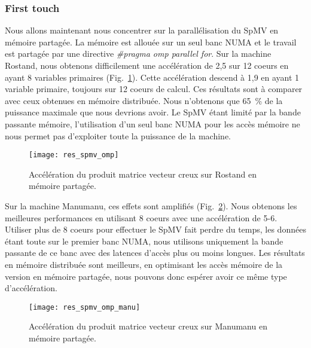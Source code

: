 \subsubsection{First touch}
Nous allons maintenant nous concentrer sur la parallélisation du SpMV en mémoire partagée.
%
La mémoire est allouée sur un seul banc NUMA et le travail est partagée par une directive {\em \#pragma omp parallel for}.
%
Sur la machine Rostand, nous obtenons difficilement une accélération de 2,5 sur 12 coeurs en ayant 8 variables primaires (Fig.~\ref{fig:res_spmv_omp_rostand}).
%
Cette accélération descend à 1,9 en ayant 1 variable primaire, toujours sur 12 coeurs de calcul.
%
Ces résultats sont à comparer avec ceux obtenues en mémoire distribuée.
%
Nous n'obtenons que 65~\% de la puissance maximale que nous devrions avoir.
%
Le SpMV étant limité par la bande passante mémoire, l'utilisation d'un seul banc NUMA pour les accès mémoire ne nous permet pas d'exploiter toute la puissance de la machine.


\begin{figure}
  \centering
  \texttt{[image: res\_spmv\_omp]}
  \caption{Accélération du produit matrice vecteur creux sur Rostand en mémoire partagée.}
  \label{fig:res_spmv_omp_rostand}
\end{figure}



Sur la machine Manumanu, ces effets sont amplifiés (Fig.~\ref{fig:res_spmv_omp_manumanu}).
%
Nous obtenons les meilleures performances en utilisant 8 coeurs avec une accélération de 5-6.
%
Utiliser plus de 8 coeurs pour effectuer le SpMV fait perdre du temps, les données étant toute sur le premier banc NUMA, nous utilisons uniquement la bande passante de ce banc avec des latences d'accès plus ou moins longues.
%
Les résultats en mémoire distribuée sont meilleurs, en optimisant les accès mémoire de la version en mémoire partagée, nous pouvons donc espérer avoir ce même type d'accélération.


\begin{figure}
  \centering
  \texttt{[image: res\_spmv\_omp\_manu]}
  \caption{Accélération du produit matrice vecteur creux sur Manumanu en mémoire partagée.}
  \label{fig:res_spmv_omp_manumanu}
\end{figure}
